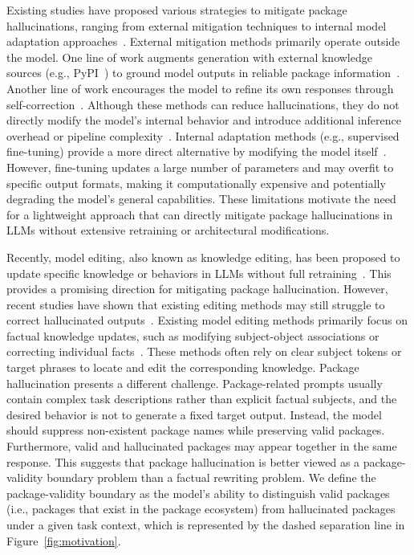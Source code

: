Existing studies have proposed various strategies to mitigate package hallucinations, ranging from external mitigation techniques to internal model adaptation approaches~\cite{spracklen2025we}. External mitigation methods primarily operate outside the model. One line of work augments generation with external knowledge sources (e.g., PyPI~\cite{pypi}) to ground model outputs in reliable package information~\cite{lewis2020retrieval,jain2025mitigating}. Another line of work encourages the model to refine its own responses through self-correction~\cite{ji2023towards,madaan2023self}. Although these methods can reduce hallucinations, they do not directly modify the model’s internal behavior and introduce additional inference overhead or pipeline complexity~\cite{huang2025survey}.
Internal adaptation methods (e.g., supervised fine-tuning) provide a more direct alternative by modifying the model itself~\cite{spracklen2025we,tonmoy2024comprehensive}. However, fine-tuning updates a large number of parameters and may overfit to specific output formats, making it computationally expensive and potentially degrading the model’s general capabilities. These limitations motivate the need for a lightweight approach that can directly mitigate package hallucinations in LLMs without extensive retraining or architectural modifications.


Recently, model editing, also known as knowledge editing, has been proposed to update specific knowledge or behaviors in LLMs without full retraining~\cite{li2025model,wang2024detoxifying,zhang2024comprehensive,liu2025creme}. 
This provides a promising direction for mitigating package hallucination.
However, recent studies have shown that existing editing methods may still struggle to correct hallucinated outputs~\cite{huang2025can}.
Existing model editing methods primarily focus on factual knowledge updates, such as modifying subject-object associations or correcting individual facts~\cite{dai2022knowledge,li2024pmet,meng2022rome,wu2023depn}. 
These methods often rely on clear subject tokens or target phrases to locate and edit the corresponding knowledge. Package hallucination presents a different challenge. Package-related prompts usually contain complex task descriptions rather than explicit factual subjects, and the desired behavior is not to generate a fixed target output. Instead, the model should suppress non-existent package names while preserving valid packages. Furthermore, valid and hallucinated packages may appear together in the same response. This suggests that package hallucination is better viewed as a package-validity boundary problem than a factual rewriting problem. We define the package-validity boundary as the model's ability to distinguish valid packages (i.e., packages that exist in the package ecosystem) from hallucinated packages under a given task context, which is represented by the dashed separation line in Figure~\ref{fig:motivation}.

